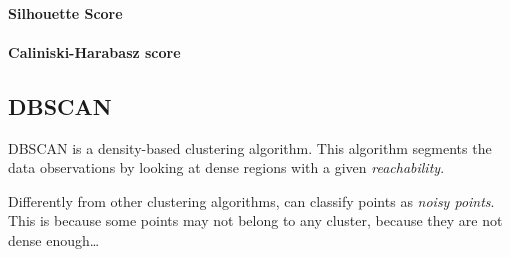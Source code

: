 \paragraph*{Silhouette Score}
\paragraph*{Caliniski-Harabasz score}

\subsection*{DBSCAN}
DBSCAN is a density-based clustering algorithm. This algorithm segments the data observations by looking at dense regions with a given \textit{reachability}.


Differently from other clustering algorithms, can classify points as \textit{noisy points}. This is because some points may not belong to any cluster, because they are not dense enough\dots
